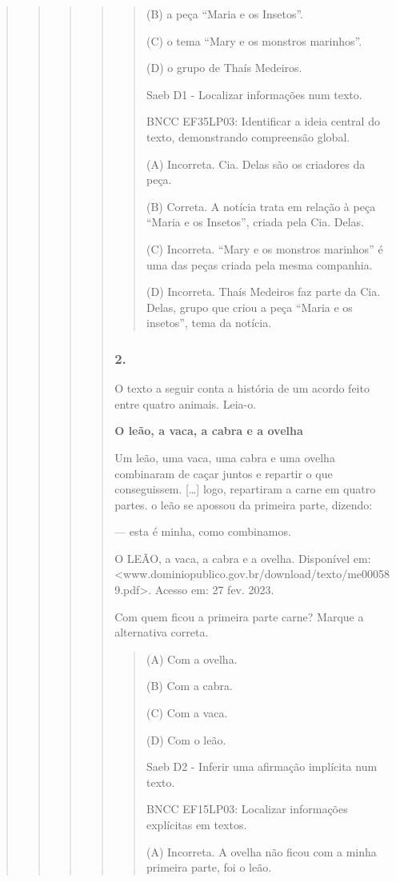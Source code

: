 \begin{quote}
\begin{quote}
\begin{quote}
\begin{quote}
\begin{quote}
(B) a peça ``Maria e os Insetos''.

(C) o tema ``Mary e os monstros marinhos''.

(D) o grupo de Thaís Medeiros.

Saeb D1 - Localizar informações num texto.

BNCC EF35LP03: Identificar a ideia central do texto, demonstrando
compreensão global.

(A) Incorreta. Cia. Delas são os criadores da peça.

(B) Correta. A notícia trata em relação à peça ``Maria e os Insetos'',
criada pela Cia. Delas.

(C) Incorreta. ``Mary e os monstros marinhos'' é uma das peças criada
pela mesma companhia.

(D) Incorreta. Thaís Medeiros faz parte da Cia. Delas, grupo que criou a
peça ``Maria e os insetos'', tema da notícia.
\end{quote}

\subsubsection{2. }\label{section-81}

O texto a seguir conta a história de um acordo feito entre quatro
animais. Leia-o.

\textbf{O leão, a vaca, a cabra e a ovelha}

Um leão, uma vaca, uma cabra e uma ovelha combinaram de caçar juntos e
repartir o que conseguissem. {[}\ldots{}{]} logo, repartiram a carne em
quatro partes. o leão se apossou da primeira parte, dizendo:

--- esta é minha, como combinamos.

O LEÃO, a vaca, a cabra e a ovelha. Disponível em:
\textless{}www.dominiopublico.gov.br/download/texto/me000589.pdf\textgreater{}.
Acesso em: 27 fev. 2023.

Com quem ficou a primeira parte carne? Marque a alternativa correta.

\begin{quote}
(A) Com a ovelha.

(B) Com a cabra.

(C) Com a vaca.

(D) Com o leão.

Saeb D2 - Inferir uma afirmação implícita num texto.

BNCC EF15LP03: Localizar informações explícitas em textos.

(A) Incorreta. A ovelha não ficou com a minha primeira parte, foi o
leão.


\end{quote}
\end{quote}
\end{quote}
\end{quote}
\end{quote}
